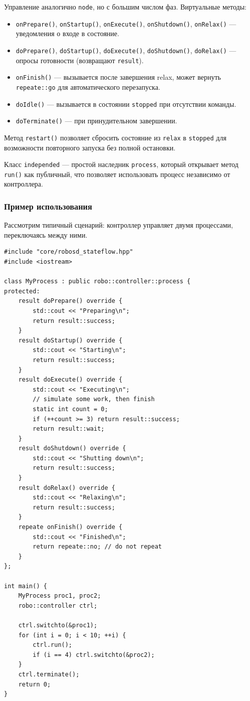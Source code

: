 \documentclass[a4paper,12pt]{article}
\begin{document}
Управление аналогично \texttt{node}, но с большим числом фаз. Виртуальные методы:

\begin{itemize}
    \item \texttt{onPrepare()}, \texttt{onStartup()}, \texttt{onExecute()}, \texttt{onShutdown()}, \texttt{onRelax()} — уведомления о входе в состояние.
    \item \texttt{doPrepare()}, \texttt{doStartup()}, \texttt{doExecute()}, \texttt{doShutdown()}, \texttt{doRelax()} — опросы готовности (возвращают \texttt{result}).
    \item \texttt{onFinish()} — вызывается после завершения relax, может вернуть \texttt{repeate::go} для автоматического перезапуска.
    \item \texttt{doIdle()} — вызывается в состоянии \texttt{stopped} при отсутствии команды.
    \item \texttt{doTerminate()} — при принудительном завершении.
\end{itemize}

Метод \texttt{restart()} позволяет сбросить состояние из \texttt{relax} в \texttt{stopped} для возможности повторного запуска без полной остановки.

Класс \texttt{independed} — простой наследник \texttt{process}, который открывает метод \texttt{run()} как публичный, что позволяет использовать процесс независимо от контроллера.

\subsubsection{Пример использования}

Рассмотрим типичный сценарий: контроллер управляет двумя процессами, переключаясь между ними.

\begin{lstlisting}[caption={Controller usage example}]
#include "core/robosd_stateflow.hpp"
#include <iostream>

class MyProcess : public robo::controller::process {
protected:
    result doPrepare() override {
        std::cout << "Preparing\n";
        return result::success;
    }
    result doStartup() override {
        std::cout << "Starting\n";
        return result::success;
    }
    result doExecute() override {
        std::cout << "Executing\n";
        // simulate some work, then finish
        static int count = 0;
        if (++count >= 3) return result::success;
        return result::wait;
    }
    result doShutdown() override {
        std::cout << "Shutting down\n";
        return result::success;
    }
    result doRelax() override {
        std::cout << "Relaxing\n";
        return result::success;
    }
    repeate onFinish() override {
        std::cout << "Finished\n";
        return repeate::no; // do not repeat
    }
};

int main() {
    MyProcess proc1, proc2;
    robo::controller ctrl;

    ctrl.switchto(&proc1);
    for (int i = 0; i < 10; ++i) {
        ctrl.run();
        if (i == 4) ctrl.switchto(&proc2);
    }
    ctrl.terminate();
    return 0;
}
\end{lstlisting}
\end{document}
